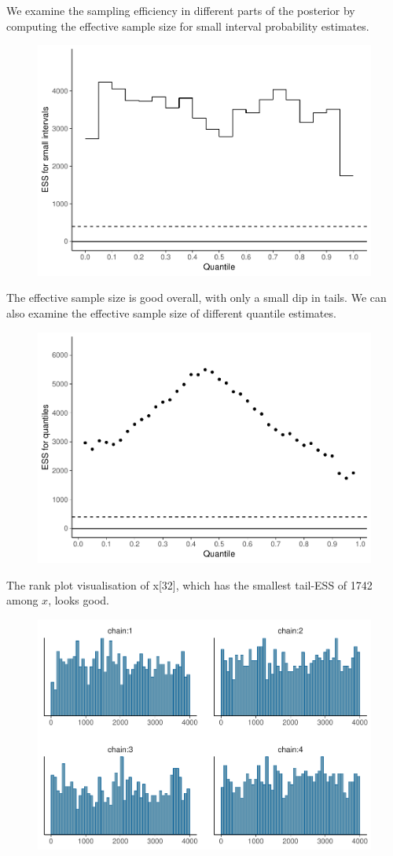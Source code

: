 \documentclass[american,]{article}
\begin{document}
We examine the sampling efficiency in different parts of the posterior
by computing the effective sample size for small interval probability
estimates.

\begin{figure}[tp]
  \centering
  \includegraphics[width=0.6\linewidth]{graphics/local-ess-fit-half-nom-1.pdf}
\end{figure}

The effective sample size is good overall, with only a small dip in
tails. We can also examine the effective sample size of different
quantile estimates.

\begin{figure}[tp]
  \centering
  \includegraphics[width=0.6\linewidth]{graphics/quantile-ess-fit-half-nom-1.pdf}
\end{figure}

The rank plot visualisation of x{[}32{]}, which has the smallest
tail-ESS of 1742 among \(x\), looks good.

\begin{figure}[tp]
  \centering
  \includegraphics[width=0.6\linewidth]{graphics/hist-fit-half-nom-1.pdf}
\end{figure}
\end{document}
